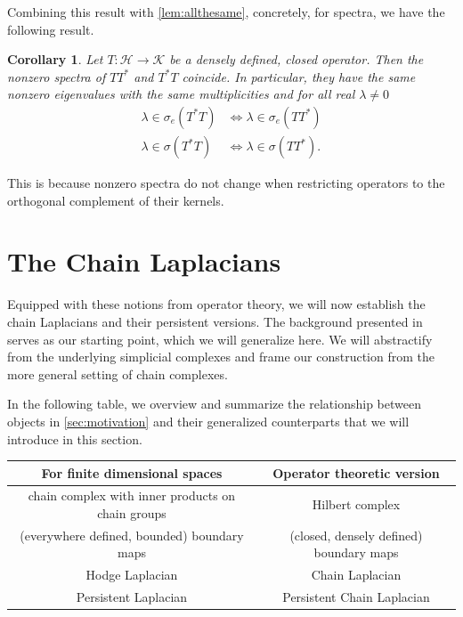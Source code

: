 \documentclass[11pt]{article}
\newtheorem{cor}[theorem]{Corollary}
\theoremstyle{definition}
\theoremstyle{remark}
\begin{document}
Combining this result with \cref{lem:allthesame}, concretely, for spectra, we have the following result.

\begin{cor} \label{lem:changeorder}
    Let $T:\mathcal{H}\to\mathcal{K}$ be a densely defined, closed operator. Then the nonzero spectra of $TT^*$ and $T^*T$ coincide. In particular, they have the same nonzero eigenvalues with the same multiplicities and for all real $\lambda \not= 0$
    \begin{align*}
        \lambda \in \sigma_e(T^*T) &\Leftrightarrow \lambda \in \sigma_e(TT^*)\\
        \lambda \in \sigma(T^*T) &\Leftrightarrow \lambda \in \sigma(TT^*).
    \end{align*}
\end{cor}

This is because nonzero spectra do not change when restricting operators to the orthogonal complement of their kernels.

\section{The Chain Laplacians} \label{sec:laplacians}

Equipped with these notions from operator theory, we will now establish the chain Laplacians and their persistent versions. The background presented in  serves as our starting point, which we will generalize here.  We will abstractify from the underlying simplicial complexes and frame our construction from the more general setting of chain complexes. 

In the following table, we overview and summarize the relationship between objects in \cref{sec:motivation} and their generalized counterparts that we will introduce in this section.

\begin{center}
    \begin{tabular}{c||c}
  For finite dimensional spaces  & Operator theoretic version \\ \hline
    chain complex with inner products on chain groups & Hilbert complex\\
    (everywhere defined, bounded) boundary maps & (closed, densely defined) boundary maps\\
    Hodge Laplacian & Chain Laplacian\\
    Persistent Laplacian & Persistent Chain Laplacian
\end{tabular}
\end{center}
\end{document}
